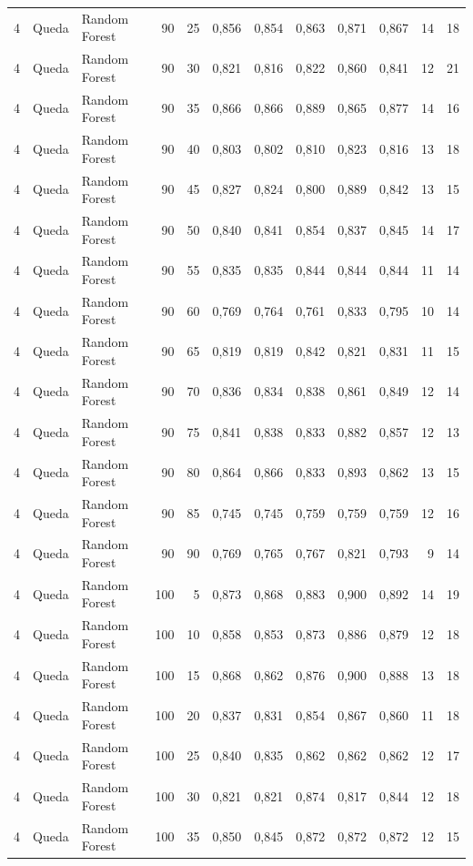 \begin{longtable}{@{}rllrrrrrrrrr@{}}
4 & Queda & Random Forest & 90 & 25 & 0,856 & 0,854 & 0,863 & 0,871 & 0,867 & 14 & 18 \\
4 & Queda & Random Forest & 90 & 30 & 0,821 & 0,816 & 0,822 & 0,860 & 0,841 & 12 & 21 \\
4 & Queda & Random Forest & 90 & 35 & 0,866 & 0,866 & 0,889 & 0,865 & 0,877 & 14 & 16 \\
4 & Queda & Random Forest & 90 & 40 & 0,803 & 0,802 & 0,810 & 0,823 & 0,816 & 13 & 18 \\
4 & Queda & Random Forest & 90 & 45 & 0,827 & 0,824 & 0,800 & 0,889 & 0,842 & 13 & 15 \\
4 & Queda & Random Forest & 90 & 50 & 0,840 & 0,841 & 0,854 & 0,837 & 0,845 & 14 & 17 \\
4 & Queda & Random Forest & 90 & 55 & 0,835 & 0,835 & 0,844 & 0,844 & 0,844 & 11 & 14 \\
4 & Queda & Random Forest & 90 & 60 & 0,769 & 0,764 & 0,761 & 0,833 & 0,795 & 10 & 14 \\
4 & Queda & Random Forest & 90 & 65 & 0,819 & 0,819 & 0,842 & 0,821 & 0,831 & 11 & 15 \\
4 & Queda & Random Forest & 90 & 70 & 0,836 & 0,834 & 0,838 & 0,861 & 0,849 & 12 & 14 \\
4 & Queda & Random Forest & 90 & 75 & 0,841 & 0,838 & 0,833 & 0,882 & 0,857 & 12 & 13 \\
4 & Queda & Random Forest & 90 & 80 & 0,864 & 0,866 & 0,833 & 0,893 & 0,862 & 13 & 15 \\
4 & Queda & Random Forest & 90 & 85 & 0,745 & 0,745 & 0,759 & 0,759 & 0,759 & 12 & 16 \\
4 & Queda & Random Forest & 90 & 90 & 0,769 & 0,765 & 0,767 & 0,821 & 0,793 & 9 & 14 \\
4 & Queda & Random Forest & 100 & 5 & 0,873 & 0,868 & 0,883 & 0,900 & 0,892 & 14 & 19 \\
4 & Queda & Random Forest & 100 & 10 & 0,858 & 0,853 & 0,873 & 0,886 & 0,879 & 12 & 18 \\
4 & Queda & Random Forest & 100 & 15 & 0,868 & 0,862 & 0,876 & 0,900 & 0,888 & 13 & 18 \\
4 & Queda & Random Forest & 100 & 20 & 0,837 & 0,831 & 0,854 & 0,867 & 0,860 & 11 & 18 \\
4 & Queda & Random Forest & 100 & 25 & 0,840 & 0,835 & 0,862 & 0,862 & 0,862 & 12 & 17 \\
4 & Queda & Random Forest & 100 & 30 & 0,821 & 0,821 & 0,874 & 0,817 & 0,844 & 12 & 18 \\
4 & Queda & Random Forest & 100 & 35 & 0,850 & 0,845 & 0,872 & 0,872 & 0,872 & 12 & 15 \\

\end{longtable}
